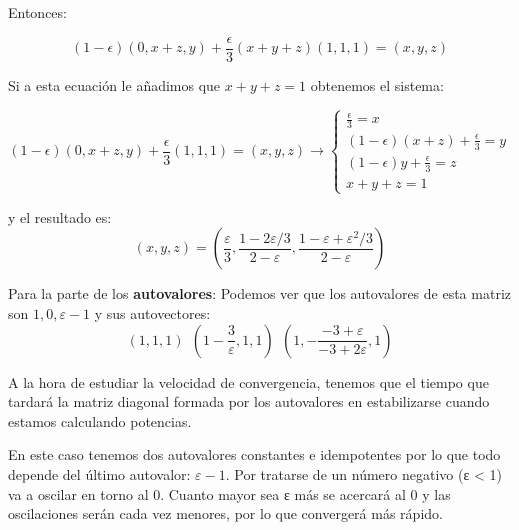 \begin{problem}[8]
	Entonces:

	$$ (1-\epsilon)(0,x+z,y) + \frac{\epsilon}{3} (x + y + z) (1,1,1) = (x,y,z) $$

	Si a esta ecuación le añadimos que $ x + y + z = 1$ obtenemos el sistema:

	$$(1-\epsilon)(0,x+z,y) + \frac{\epsilon}{3} (1,1,1) = (x,y,z) \rightarrow \begin{cases}
	\frac{\epsilon}{3}= x\\
	(1-\epsilon)(x+z) + \frac{\epsilon}{3}=y\\
	(1-\epsilon) y + \frac{\epsilon}{3} = z\\
	x + y +z = 1
	\end{cases}$$

	y el resultado es:
	$$(x,y,z) = \left(\frac{ε}{3}, \frac{1-2ε/3}{2-ε}, \frac{1-ε+ε^2/3}{2-ε}\right)$$

	Para la parte de los \textbf{autovalores}:
	Podemos ver que los autovalores de esta matriz son $1,0,ε-1$ y sus autovectores:
	\[(1,1,1) \ \ \left( 1-\frac{3}{ε},1,1\right) \ \ \left(1,-\frac{-3+ε}{-3+2ε},1 \right)\]

	A la hora de estudiar la velocidad de convergencia, tenemos que el tiempo que tardará la matriz diagonal formada por los autovalores en estabilizarse cuando estamos calculando potencias.

	En este caso tenemos dos autovalores constantes e idempotentes por lo que todo depende del último autovalor: $ε-1$. Por tratarse de un número negativo (ε < 1) va a oscilar en torno al 0. Cuanto mayor sea ε más se acercará al 0 y las oscilaciones serán cada vez menores, por lo que convergerá más rápido.
\end{problem}

